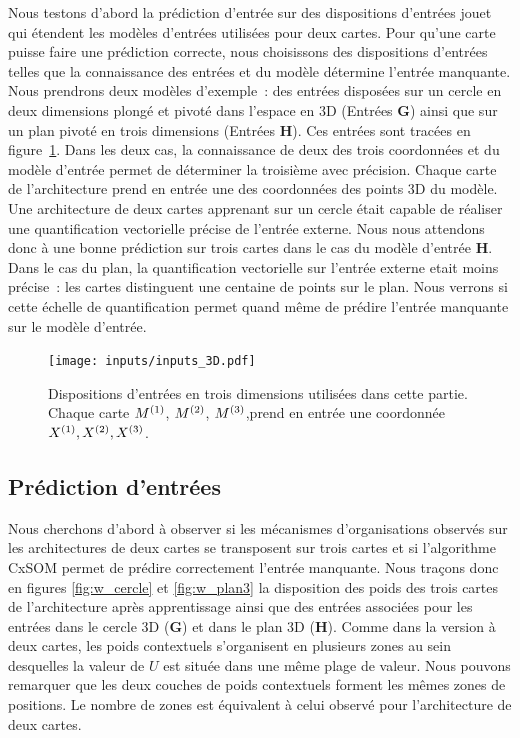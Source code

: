 \documentclass[../main]{subfiles}
\begin{document}
Nous testons d'abord la prédiction d'entrée sur des dispositions d'entrées jouet qui étendent les modèles d'entrées utilisées pour deux cartes.
Pour qu'une carte puisse faire une prédiction correcte, nous choisissons des dispositions d'entrées telles que la connaissance des entrées et du modèle détermine l'entrée manquante.
Nous prendrons deux modèles d'exemple~: des entrées disposées sur un cercle en deux dimensions plongé et pivoté dans l'espace en 3D (Entrées \textbf{G}) ainsi que sur un plan pivoté en trois dimensions (Entrées \textbf{H}). 
Ces entrées sont tracées en figure~\ref{fig:inputs_3D}. 
Dans les deux cas, la connaissance de deux des trois coordonnées et du modèle d'entrée permet de déterminer la troisième avec précision. Chaque carte de l'architecture prend en entrée une des coordonnées des points 3D du modèle.
Une architecture de deux cartes apprenant sur un cercle était capable de réaliser une quantification vectorielle précise de l'entrée externe. Nous nous attendons donc à une bonne prédiction sur trois cartes dans le cas du modèle d'entrée \textbf{H}. 
Dans le cas du plan, la quantification vectorielle sur l'entrée externe etait moins précise~: les cartes distinguent une centaine de points sur le plan. Nous verrons si cette échelle de quantification permet quand même de prédire l'entrée manquante sur le modèle d'entrée.


\begin{figure}[h!]
	\texttt{[image: inputs/inputs\_3D.pdf]}
	\caption{Dispositions d'entrées en trois dimensions utilisées dans cette partie. Chaque carte $M^{({1})}$, $M^{({2})}$, $M^{({3})}$,prend en entrée une coordonnée $X^{({1})}, X^{({2})}, X^{({3})}$. \label{fig:inputs_3D}}
\end{figure}

\subsection{Prédiction d'entrées}

Nous cherchons d'abord à observer si les mécanismes d'organisations observés sur les architectures de deux cartes se transposent sur trois cartes et si l'algorithme CxSOM permet de prédire correctement l'entrée manquante.
Nous traçons donc en figures \ref{fig:w_cercle} et \ref{fig:w_plan3} la disposition des poids des trois cartes de l'architecture après apprentissage ainsi que des entrées associées pour les entrées dans le cercle 3D (\textbf{G}) et dans le plan 3D (\textbf{H}).
Comme dans la version à deux cartes, les poids contextuels s'organisent en plusieurs zones au sein desquelles la valeur de $U$ est située dans une même plage de valeur.
Nous pouvons remarquer que les deux couches de poids contextuels forment les mêmes zones de positions.
Le nombre de zones est équivalent à celui observé pour l'architecture de deux cartes.
\end{document}
